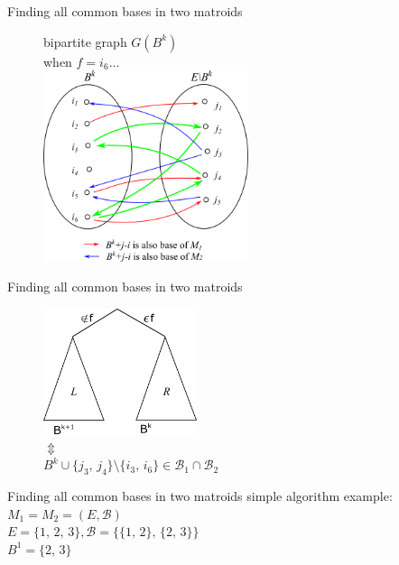 \documentclass[11pt,xcolor=dvipsnames,table,dvipdfmx]{beamer}
\begin{document}
\begin{frame}{Finding all common bases in two matroids}
 \begin{figure}
  bipartite graph $G(B^k)$\\
  when $f = i_6$...\vspace{0.52cm}\\
  \centering
  \includegraphics[width=6cm]{text8631-16-2-8.png}\\
 \end{figure}
\end{frame}

\begin{frame}{Finding all common bases in two matroids}
 \begin{figure}
  \centering
  \includegraphics[width=4.5cm]{text8631-16-2-9.png}\\
  $\Updownarrow$ \\
  $B^k \cup \{j_3,\,j_4\}\setminus \{i_3,\,i_6\} \in \mathcal{B}_1 \cap \mathcal{B}_2$
 \end{figure}
\end{frame}

\begin{frame}{Finding all common bases in two matroids}
 simple algorithm example:\\
 $M_1 = M_2 = (E, \mathcal{B})$\\
 $E = \{1,\,2,\,3\}, \mathcal{B} = \{\{1,\,2\},\,\{2,\,3\}\}$\\
 $B^1 = \{2,\,3\}$
\end{frame}
\end{document}
